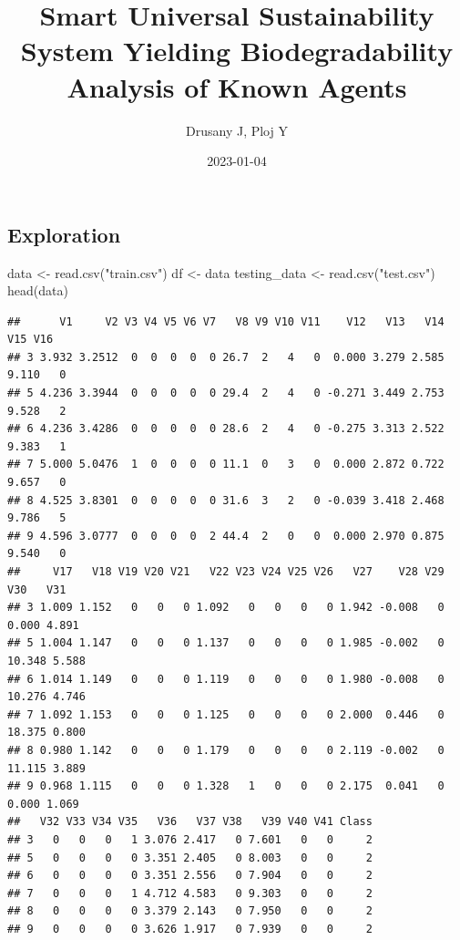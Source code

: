 \documentclass[
]{article}
\title{Smart Universal Sustainability System Yielding Biodegradability
Analysis of Known Agents}
\author{Drusany J, Ploj Y}
\date{2023-01-04}
\newenvironment{Shaded}{\begin{snugshade}}{\end{snugshade}}
\newcommand{\FunctionTok}[1]{\textcolor[rgb]{0.00,0.00,0.00}{#1}}
\newcommand{\NormalTok}[1]{#1}
\newcommand{\OtherTok}[1]{\textcolor[rgb]{0.56,0.35,0.01}{#1}}
\newcommand{\StringTok}[1]{\textcolor[rgb]{0.31,0.60,0.02}{#1}}
\begin{document}
\maketitle

\hypertarget{exploration}{%
\subsection{Exploration}\label{exploration}}

\begin{Shaded}
\begin{Highlighting}[]
\NormalTok{data }\OtherTok{\textless{}{-}} \FunctionTok{read.csv}\NormalTok{(}\StringTok{"train.csv"}\NormalTok{)}
\NormalTok{df }\OtherTok{\textless{}{-}}\NormalTok{ data}
\NormalTok{testing\_data }\OtherTok{\textless{}{-}} \FunctionTok{read.csv}\NormalTok{(}\StringTok{"test.csv"}\NormalTok{)}
\FunctionTok{head}\NormalTok{(data)}
\end{Highlighting}
\end{Shaded}

\begin{verbatim}
##      V1     V2 V3 V4 V5 V6 V7   V8 V9 V10 V11    V12   V13   V14   V15 V16
## 3 3.932 3.2512  0  0  0  0  0 26.7  2   4   0  0.000 3.279 2.585 9.110   0
## 5 4.236 3.3944  0  0  0  0  0 29.4  2   4   0 -0.271 3.449 2.753 9.528   2
## 6 4.236 3.4286  0  0  0  0  0 28.6  2   4   0 -0.275 3.313 2.522 9.383   1
## 7 5.000 5.0476  1  0  0  0  0 11.1  0   3   0  0.000 2.872 0.722 9.657   0
## 8 4.525 3.8301  0  0  0  0  0 31.6  3   2   0 -0.039 3.418 2.468 9.786   5
## 9 4.596 3.0777  0  0  0  0  2 44.4  2   0   0  0.000 2.970 0.875 9.540   0
##     V17   V18 V19 V20 V21   V22 V23 V24 V25 V26   V27    V28 V29    V30   V31
## 3 1.009 1.152   0   0   0 1.092   0   0   0   0 1.942 -0.008   0  0.000 4.891
## 5 1.004 1.147   0   0   0 1.137   0   0   0   0 1.985 -0.002   0 10.348 5.588
## 6 1.014 1.149   0   0   0 1.119   0   0   0   0 1.980 -0.008   0 10.276 4.746
## 7 1.092 1.153   0   0   0 1.125   0   0   0   0 2.000  0.446   0 18.375 0.800
## 8 0.980 1.142   0   0   0 1.179   0   0   0   0 2.119 -0.002   0 11.115 3.889
## 9 0.968 1.115   0   0   0 1.328   1   0   0   0 2.175  0.041   0  0.000 1.069
##   V32 V33 V34 V35   V36   V37 V38   V39 V40 V41 Class
## 3   0   0   0   1 3.076 2.417   0 7.601   0   0     2
## 5   0   0   0   0 3.351 2.405   0 8.003   0   0     2
## 6   0   0   0   0 3.351 2.556   0 7.904   0   0     2
## 7   0   0   0   1 4.712 4.583   0 9.303   0   0     2
## 8   0   0   0   0 3.379 2.143   0 7.950   0   0     2
## 9   0   0   0   0 3.626 1.917   0 7.939   0   0     2
\end{verbatim}
\end{document}
